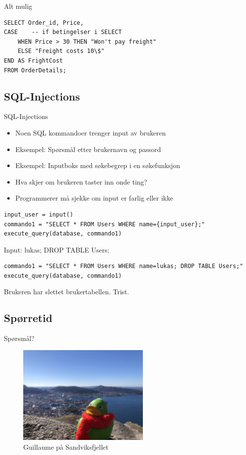 \begin{frame}[fragile]{Alt mulig}
\begin{verbatim}
SELECT Order_id, Price,
CASE    -- if betingelser i SELECT
    WHEN Price > 30 THEN "Won't pay freight"
    ELSE "Freight costs 10\$"
END AS FrightCost
FROM OrderDetails; 
\end{verbatim}
\end{frame}

\subsection*{SQL-Injections}
\begin{frame}{SQL-Injections}
    \begin{itemize}[<+->]
        \item Noen SQL kommandoer trenger input av brukeren
        \item Eksempel: Spørsmål etter brukernavn og passord
        \item Eksempel: Inputboks med søkebegrep i en søkefunksjon
        \item Hva skjer om brukeren taster inn onde ting?
        \item Programmerer må sjekke om input er farlig eller ikke
    \end{itemize}
\end{frame}

\begin{frame}[fragile]{}
\begin{verbatim}
input_user = input()
commando1 = "SELECT * FROM Users WHERE name={input_user};"
execute_query(database, commando1)
\end{verbatim}
\pause
Input: lukas; DROP TABLE Users;
\pause
\begin{verbatim}
commando1 = "SELECT * FROM Users WHERE name=lukas; DROP TABLE Users;"
execute_query(database, commando1)
\end{verbatim}
\pause
Brukeren har slettet brukertabellen. \pause Trist.
\end{frame}

\subsection*{Spørretid}
\begin{frame}{Spørsmål?}
    \begin{figure}
        \centering
        \includegraphics[height = 4.9cm]{images/guillaume1.jpg}
        \caption{Guillaume på Sandviksfjellet}
        \label{fig:guillaume1}
    \end{figure}
\end{frame}

